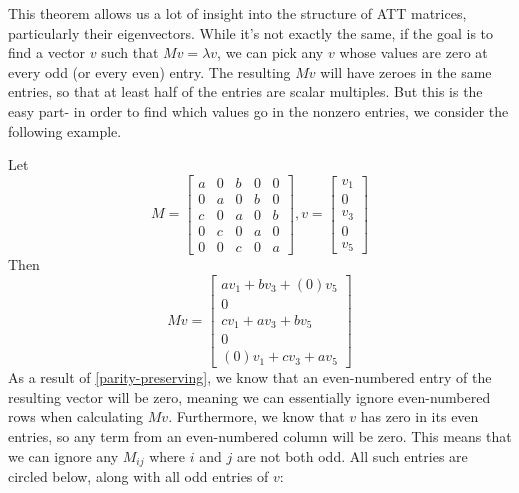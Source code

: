\documentclass[10pt,twocolumn]{article}
\begin{document}
This theorem allows us a lot of insight into the structure of ATT matrices, particularly their eigenvectors. While it's not exactly the same, if the goal is to find a vector $v$ such that $Mv=\lambda v$, we can pick any $v$ whose values are zero at every odd (or every even) entry. The resulting $Mv$ will have zeroes in the same entries, so that at least half of the entries are scalar multiples. But this is the easy part- in order to find which values go in the nonzero entries, we consider the following example.

\begin{example}
    Let
    $$M=\begin{bmatrix}
        a & 0 & b & 0 & 0 \\
        0 & a & 0 & b & 0 \\
        c & 0 & a & 0 & b \\
        0 & c & 0 & a & 0 \\
        0 & 0 & c & 0 & a
    \end{bmatrix}, v=\begin{bmatrix}
        v_1 \\
        0 \\
        v_3 \\
        0 \\
        v_5
    \end{bmatrix}
        $$
    Then $$Mv=\begin{bmatrix}
        av_1 + bv_3 + (0)v_5 \\
        0 \\
        cv_1 + av_3 + bv_5 \\
        0 \\
        (0)v_1 + cv_3 + av_5
    \end{bmatrix}$$
    As a result of \ref{parity-preserving}, we know that an even-numbered entry of the resulting vector will be zero, meaning we can essentially ignore even-numbered rows when calculating $Mv$. Furthermore, we know that $v$ has zero in its even entries, so any term from an even-numbered column will be zero. This means that we can ignore any $M_{ij}$ where $i$ and $j$ are not both odd. All such entries are circled below, along with all odd entries of $v$:


\end{example}
\end{document}
